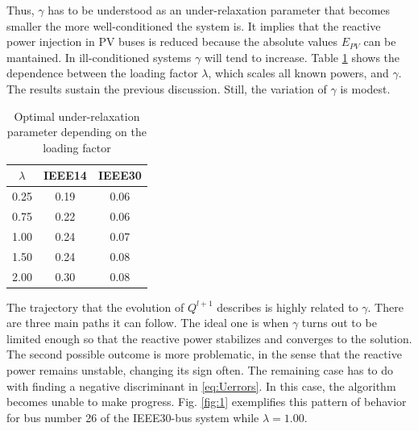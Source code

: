 \documentclass[journal]{IEEEtran}
\begin{document}
Thus, $\gamma$ has to be understood as an under-relaxation parameter \cite{asd} that becomes smaller the more well-conditioned the system is. It implies that the reactive power injection in PV buses is reduced because the absolute values $E_{PV}$ can be mantained. In ill-conditioned systems $\gamma$ will tend to increase. Table \ref{tab:0} shows the dependence between the loading factor $\lambda$, which scales all known powers, and $\gamma$. The results sustain the previous discussion. Still, the variation of $\gamma$ is modest.

\begin{table}[!ht]
  \renewcommand{\arraystretch}{1.3}
  \caption{Optimal under-relaxation parameter depending on the loading factor}
  \label{tab:0}
  \centering
  \begin{tabular}{ccc}
  \hline
  $\lambda$ & IEEE14 & IEEE30\\
  \hline
  0.25 & 0.19 & 0.06\\
  0.75 & 0.22 & 0.06\\
  1.00 & 0.24 & 0.07\\
  1.50 & 0.24 & 0.08\\
  2.00 & 0.30 & 0.08\\
  \hline
  \end{tabular}
  \end{table} 

The trajectory that the evolution of $Q^{l+1}$ describes is highly related to $\gamma$. There are three main paths it can follow. The ideal one is when $\gamma$ turns out to be limited enough so that the reactive power stabilizes and converges to the solution. The second possible outcome is more problematic, in the sense that the reactive power remains unstable, changing its sign often. The remaining case has to do with finding a negative discriminant in \eqref{eq:Uerrors}. In this case, the algorithm becomes unable to make progress. Fig. \ref{fig:1} exemplifies this pattern of behavior for bus number 26 of the IEEE30-bus system while $\lambda=1.00$.
\end{document}
